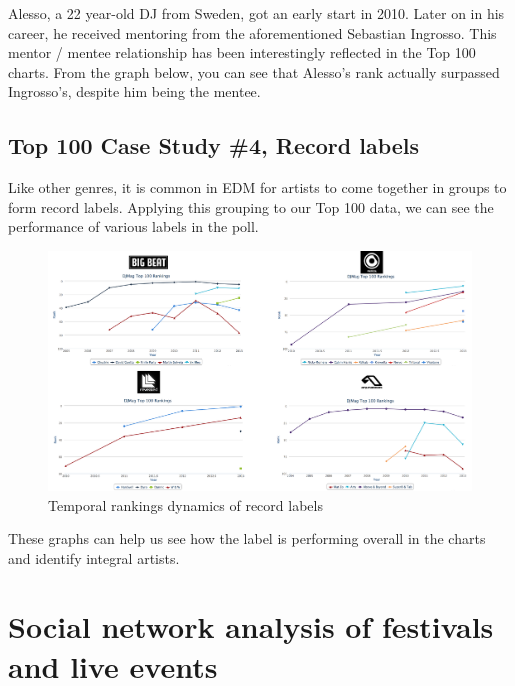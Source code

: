 \documentclass[12pt]{dalcsthesis}
\begin{document}
Alesso, a 22 year-old DJ from Sweden, got an early start in 2010. Later on in his career, he received mentoring from the aforementioned Sebastian Ingrosso. This mentor / mentee relationship has been interestingly reflected in the Top 100 charts. From the graph below, you can see that Alesso's rank actually surpassed Ingrosso's, despite him being the mentee.

\section{Top 100 Case Study \#4, Record labels}

Like other genres, it is common in EDM for artists to come together in groups to form record labels. Applying this grouping to our Top 100 data, we can see the performance of various labels in the poll. 

\begin{figure}[h]
\includegraphics[scale=.45]{label_graph}
\centering
\caption{Temporal rankings dynamics of record labels}
\end{figure}

These graphs can help us see how the label is performing overall in the charts and identify integral artists. 

\chapter{Social network analysis of festivals and live events}
\end{document}
